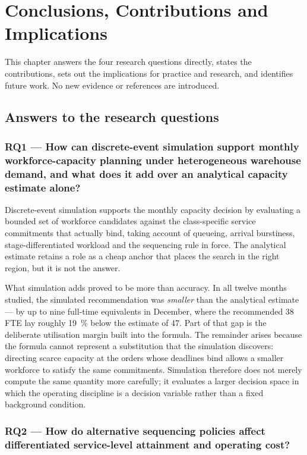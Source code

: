 \chapter{Conclusions, Contributions and Implications}
\label{ch:conclusions}

This chapter answers the four research questions directly, states the contributions, sets out
the implications for practice and research, and identifies future work. No new evidence or
references are introduced.

\section{Answers to the research questions}
\label{sec:answers}

\subsection*{RQ1 --- How can discrete-event simulation support monthly workforce-capacity
planning under heterogeneous warehouse demand, and what does it add over an analytical capacity
estimate alone?}

Discrete-event simulation supports the monthly capacity decision by evaluating a bounded set of
workforce candidates against the class-specific service commitments that actually bind, taking
account of queueing, arrival burstiness, stage-differentiated workload and the sequencing rule
in force. The analytical estimate retains a role as a cheap anchor that places the search in the
right region, but it is not the answer.

What simulation adds proved to be more than accuracy. In all twelve months studied, the
simulated recommendation was \emph{smaller} than the analytical estimate --- by up to nine
full-time equivalents in December, where the recommended 38 FTE lay roughly \SI{19}{\percent}
below the estimate of 47. Part of that gap is the deliberate utilisation margin built into the
formula. The remainder arises
because the formula cannot represent a substitution that the simulation discovers: directing
scarce capacity at the orders whose deadlines bind allows a smaller workforce to satisfy the
same commitments. Simulation therefore does not merely compute the same quantity more
carefully; it evaluates a larger decision space in which the operating discipline is a decision
variable rather than a fixed background condition.

\subsection*{RQ2 --- How do alternative sequencing policies affect differentiated service-level
attainment and operating cost?}

